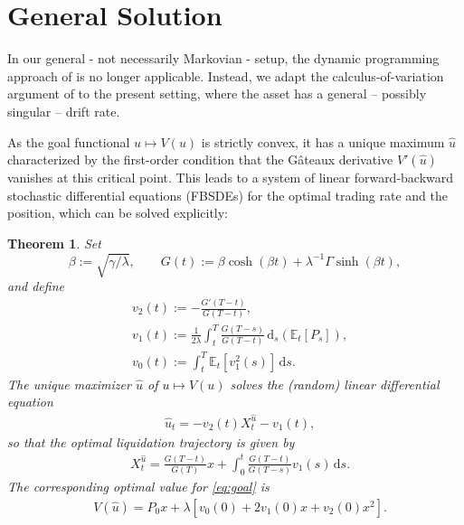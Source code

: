 \documentclass[11pt]{article}
\newtheorem{thm}{Theorem}[section]
\theoremstyle{definition}
\theoremstyle{remark}
\newcommand{\E}{\mathbb{E}} %
\newcommand{\ts}{\textstyle}
\newcommand{\closeEqn}{\tag*{$\diamond$}}
\newcommand{\de}{\,\mathrm{d}}
\begin{document}
\section{General Solution}\label{s:result}

In our general - not necessarily Markovian - setup, the dynamic programming approach of \cite{lehalle2017incorporating} is no longer applicable. Instead, we adapt the calculus-of-variation argument of \cite{bank2017hedging,bouchard2017equilibrium} to the present setting, where the asset has a general -- possibly singular -- drift rate. 

As the goal functional $u\mapsto V(u)$ is strictly convex, it has a unique maximum $\hat{u}$ characterized by the first-order condition that the G\^ateaux derivative $V'(\hat{u})$ vanishes at this critical point. This leads to a system of linear forward-backward stochastic differential equations (FBSDEs) for the optimal trading rate and the position, which can be solved explicitly:

\begin{thm}\label{main}
Set 
$$\beta:=\sqrt{\gamma/\lambda}, \qquad G(t):= \beta\cosh(\beta t)+\lambda^{-1}\Gamma\sinh(\beta t),
$$
and define 
\begin{align*}
& v_2(t):= %
-\frac{G'(T-t)}{G(T-t)},\\%
& v_1(t):= \frac{1}{2\lambda}\int_t^T \frac{G(T-s)}{G(T-t)} \de_s\left(\E_t[P_s]\right),\\ %
& v_0(t):= \int_t^T \E_t[v_1^2(s)] \de s.
\end{align*}
The unique maximizer $\hat{u}$ of $u\mapsto V(u)$ solves the (random) linear differential equation
\begin{align}\label{eq:ODE}
&\hat{u}_t = -v_2(t) X^{\hat{u}}_t - v_1(t),
\end{align}
so that the optimal liquidation trajectory is given by
\begin{align}\label{eq:Pos}
&X^{\hat{u}}_t = \frac{G(T-t)}{G(T)}x + \int_0^t \frac{G(T-t)}{G(T-s)} v_1(s) \de s.
\end{align}
The corresponding optimal value for \eqref{eq:goal} is 
\begin{align}\label{eq:goal}
&\ts V(\hat{u}) = P_0 x + \lambda\left[v_0(0) + 2 v_1(0) x + v_2(0) x^2\right]. \closeEqn
\end{align}
\end{thm}
\end{document}
